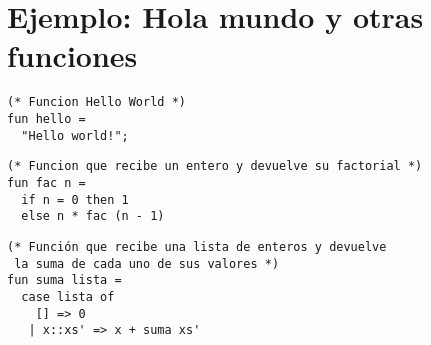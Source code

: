 \documentclass[11pt]{article} %
\begin{document}
\section{\color{red}Ejemplo: Hola mundo y otras funciones}

\begin{lstlisting}[frame=single]  % Start your code-block
(* Funcion Hello World *)
fun hello =
  "Hello world!";
\end{lstlisting}

\begin{lstlisting}[frame=single]
(* Funcion que recibe un entero y devuelve su factorial *)
fun fac n =
  if n = 0 then 1
  else n * fac (n - 1)
\end{lstlisting}


\begin{lstlisting}[frame=single]  % Start your code-block
(* Función que recibe una lista de enteros y devuelve
 la suma de cada uno de sus valores *)
fun suma lista =
  case lista of
    [] => 0
   | x::xs' => x + suma xs'
\end{lstlisting}



\end{document}
